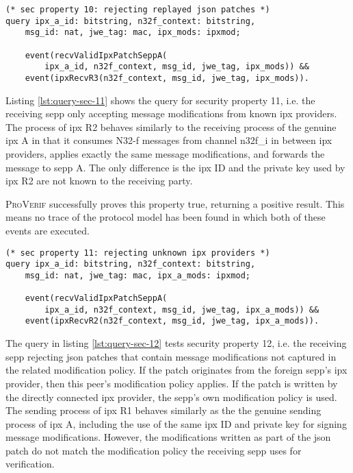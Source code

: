 \begin{lstlisting}[caption={Query for security property 10},label={lst:query-sec-10},firstnumber=221]
(* sec property 10: rejecting replayed json patches *)
query ipx_a_id: bitstring, n32f_context: bitstring,
    msg_id: nat, jwe_tag: mac, ipx_mods: ipxmod;

    event(recvValidIpxPatchSeppA(
        ipx_a_id, n32f_context, msg_id, jwe_tag, ipx_mods)) &&
    event(ipxRecvR3(n32f_context, msg_id, jwe_tag, ipx_mods)).
\end{lstlisting}

Listing \ref{lst:query-sec-11} shows the query for security property 11, i.e. the receiving \gls{sepp} only accepting message modifications from known \gls{ipx} providers.
The process of \gls{ipx} R2 behaves similarly to the receiving process of the genuine \gls{ipx} A in that it consumes N32-f messages from channel {\sffamily n32f\_i} in between \gls{ipx} providers, applies exactly the same message modifications, and forwards the message to \gls{sepp} A.
The only difference is the \gls{ipx} ID and the private key used by \gls{ipx} R2 are not known to the receiving party.

\textsc{ProVerif} successfully proves this property true, returning a positive result.
This means no trace of the protocol model has been found in which both of these events are executed.

\begin{lstlisting}[caption={Query for security property 11},label={lst:query-sec-11},firstnumber=221]
(* sec property 11: rejecting unknown ipx providers *)
query ipx_a_id: bitstring, n32f_context: bitstring,
    msg_id: nat, jwe_tag: mac, ipx_a_mods: ipxmod;

    event(recvValidIpxPatchSeppA(
        ipx_a_id, n32f_context, msg_id, jwe_tag, ipx_a_mods)) &&
    event(ipxRecvR2(n32f_context, msg_id, jwe_tag, ipx_a_mods)).
\end{lstlisting}

The query in listing \ref{lst:query-sec-12} tests security property 12, i.e. the receiving \gls{sepp} rejecting \gls{json} patches that contain message modifications not captured in the related modification policy.
If the patch originates from the foreign \gls{sepp}'s \gls{ipx} provider, then this peer's modification policy applies.
If the patch is written by the directly connected \gls{ipx} provider, the \gls{sepp}'s own modification policy is used.
The sending process of \gls{ipx} R1 behaves similarly as the the genuine sending process of \gls{ipx} A, including the use of the same \gls{ipx} ID and private key for signing message modifications.
However, the modifications written as part of the \gls{json} patch do not match the modification policy the receiving \gls{sepp} uses for verification.

